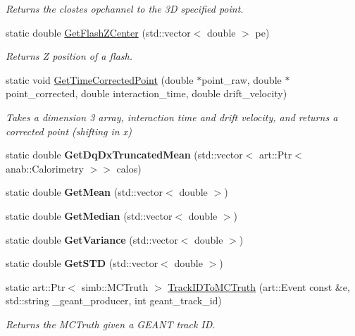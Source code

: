 \begin{DoxyCompactItemize}
\begin{DoxyCompactList}\small\item\em Returns the clostes opchannel to the 3\-D specified point. \end{DoxyCompactList}\item 
static double \hyperlink{classUBXSecHelper_a3fd25ef568b54aded55d6c1b6a8593fa}{Get\-Flash\-Z\-Center} (std\-::vector$<$ double $>$ pe)
\begin{DoxyCompactList}\small\item\em Returns Z position of a flash. \end{DoxyCompactList}\item 
static void \hyperlink{classUBXSecHelper_a44a38546ab8f9a473f0957af008219d4}{Get\-Time\-Corrected\-Point} (double $\ast$point\-\_\-raw, double $\ast$point\-\_\-corrected, double interaction\-\_\-time, double drift\-\_\-velocity)
\begin{DoxyCompactList}\small\item\em Takes a dimension 3 array, interaction time and drift velocity, and returns a corrected point (shifting in x) \end{DoxyCompactList}\item 
\hypertarget{classUBXSecHelper_a1510ec3db42854ce3b6fb6c70b3bdb59}{static double {\bfseries Get\-Dq\-Dx\-Truncated\-Mean} (std\-::vector$<$ art\-::\-Ptr$<$ anab\-::\-Calorimetry $>$$>$ calos)}\label{classUBXSecHelper_a1510ec3db42854ce3b6fb6c70b3bdb59}

\item 
\hypertarget{classUBXSecHelper_a7b30d498de5b4468a717f6223e6d43a0}{static double {\bfseries Get\-Mean} (std\-::vector$<$ double $>$)}\label{classUBXSecHelper_a7b30d498de5b4468a717f6223e6d43a0}

\item 
\hypertarget{classUBXSecHelper_a69277b565e667891e4fe820f7beca6cf}{static double {\bfseries Get\-Median} (std\-::vector$<$ double $>$)}\label{classUBXSecHelper_a69277b565e667891e4fe820f7beca6cf}

\item 
\hypertarget{classUBXSecHelper_ab9aa3a755a90de77e5b61412c04206b2}{static double {\bfseries Get\-Variance} (std\-::vector$<$ double $>$)}\label{classUBXSecHelper_ab9aa3a755a90de77e5b61412c04206b2}

\item 
\hypertarget{classUBXSecHelper_aea63fece97a7aaefb3956eb312a844a0}{static double {\bfseries Get\-S\-T\-D} (std\-::vector$<$ double $>$)}\label{classUBXSecHelper_aea63fece97a7aaefb3956eb312a844a0}

\item 
static art\-::\-Ptr$<$ simb\-::\-M\-C\-Truth $>$ \hyperlink{classUBXSecHelper_a3ab95e69a7b94a8b50de724e2f04f69e}{Track\-I\-D\-To\-M\-C\-Truth} (art\-::\-Event const \&e, std\-::string \-\_\-geant\-\_\-producer, int geant\-\_\-track\-\_\-id)
\begin{DoxyCompactList}\small\item\em Returns the M\-C\-Truth given a G\-E\-A\-N\-T track I\-D. \end{DoxyCompactList}\end{DoxyCompactItemize}


